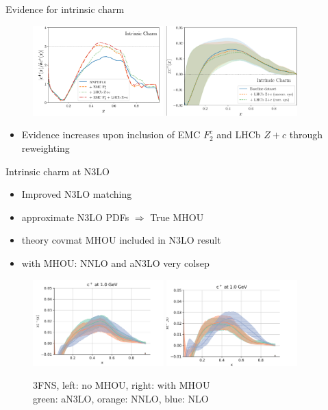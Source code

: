 \documentclass[aspectratio=43, 8pt,t]{beamer}
\begin{document}
\begin{frame}{Evidence for intrinsic charm}
  \begin{figure}
    \includegraphics[width=0.45\textwidth]{ic_f2c_zc.png}
    \includegraphics[width=0.45\textwidth]{lhcb_reweithed.png}
  \end{figure}
  \begin{itemize}
    \item Evidence increases upon inclusion of EMC $F_2^c$ and LHCb $Z+c$ through reweighting
  \end{itemize}
\end{frame}

\begin{frame}{Intrinsic charm at N3LO}
  \begin{itemize}
    \item Improved N3LO matching
    \item approximate N3LO PDFs $\Rightarrow$ True MHOU
    \item theory covmat MHOU included in N3LO result
    \item with MHOU: NNLO and aN3LO very colsep
  \end{itemize}
  \begin{figure}
    \includegraphics[width=0.45\textwidth]{n3lo_charm.png}
    \includegraphics[width=0.45\textwidth]{n3lo_charm_mhou.png}
    \caption*{3FNS, left: no MHOU, right: with MHOU \\ green: aN3LO, orange: NNLO, blue: NLO}
  \end{figure}
\end{frame}
\end{document}
